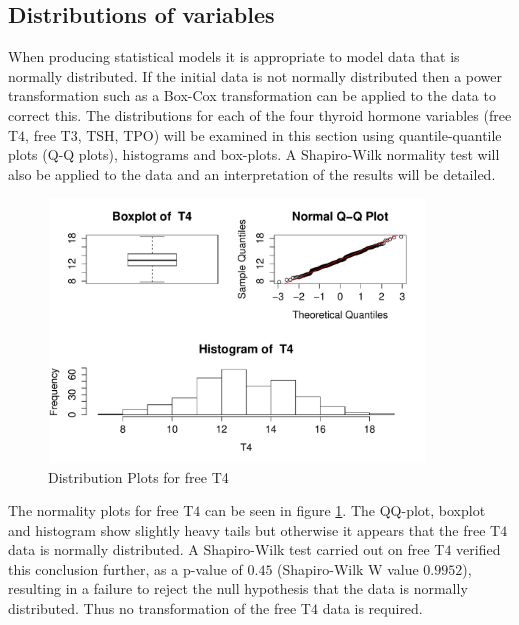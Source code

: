 \documentclass[12pt,a4paper]{report}
\begin{document}
\subsection{Distributions of variables}
When producing statistical models it is appropriate to model data that is normally distributed. If the initial data is not normally distributed then a power transformation such as a Box-Cox transformation can be applied to the data to correct this. The distributions for each of the four thyroid hormone variables (free T$4$, free T$3$, TSH, TPO) will be examined in this section using quantile-quantile plots (Q-Q plots), histograms and box-plots. A Shapiro-Wilk normality test will also be applied to the data and an interpretation of the results will be detailed.
\vspace{2mm}

\begin{figure}[ht]\centering
    \includegraphics[width=10cm,height=7cm]{NormT4.pdf}
    \caption{Distribution Plots for free T4}
    \label{Distribution:T4}
\end{figure}
\vspace{2mm}

The normality plots for free T$4$ can be seen in figure \ref{Distribution:T4}. The QQ-plot, boxplot and histogram show slightly heavy tails but otherwise it appears that the free T$4$ data is normally distributed. A Shapiro-Wilk test carried out on free T$4$ verified this conclusion further, as a p-value of $0.45$ (Shapiro-Wilk W value $0.9952$), resulting in a failure to reject the null hypothesis that the data is normally distributed. Thus no transformation of the free T$4$ data is required.
\vspace{2mm}
\end{document}
